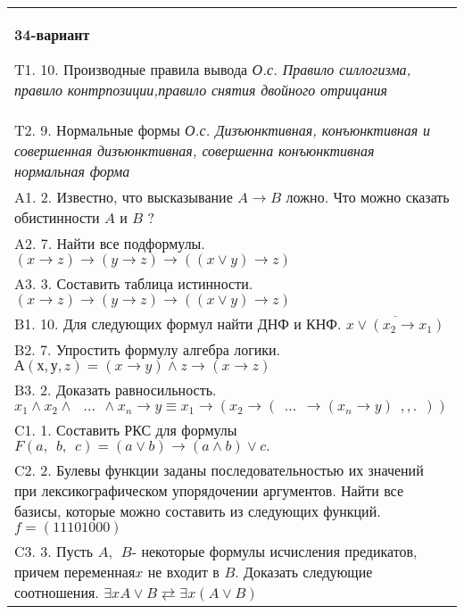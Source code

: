 \documentclass{article}
\begin{document}
\begin{tabular}{m{17cm}}
\textbf{34-вариант}
\newline

T1. 10. Производные правила вывода \emph{О.с. Правило силлогизма, правило контрпозиции,правило снятия двойного отрицания} \\
T2. 9. Нормальные формы \emph{О.с. Дизъюнктивная, конъюнктивная и совершенная дизъюнктивная, совершенна конъюнктивная нормальная форма} \\
A1. 2. Известно, что высказывание \(A \rightarrow B\) ложно. Что можно сказать обистинности \(A\) и \(B\) ? \\
A2. 7. Найти все подформулы. \((x \rightarrow z) \rightarrow (y \rightarrow z) \rightarrow ((x \vee y) \rightarrow z)\) \\
A3. 3. Составить таблица истинности. \((x \rightarrow z) \rightarrow (y \rightarrow z) \rightarrow ((x \vee y) \rightarrow z)\) \\
B1. 10. Для следующих формул найти ДНФ и КНФ. \(\overline{x \vee (x_{2} \rightarrow x_{1})}\) \\
B2. 7. Упростить формулу алгебра логики. \(А(х,у,z) = (x \rightarrow y) \land z \rightarrow (x \rightarrow z)\) \\
B3. 2. Доказать равносильность.\(x_{1} \land x_{2} \land \ \ \ ...\ \  \land x_{n} \rightarrow y \equiv x_{1} \rightarrow (x_{2} \rightarrow (\ \ ...\ \  \rightarrow (x_{n} \rightarrow y)\ \ ,,.\ \ ))\) \\
C1. 1. Составить РКС для формулы \(F(a,\ \ b,\ \ c) = (a \vee b) \rightarrow (a \land b) \vee c.\) \\
C2. 2. Булевы функции заданы последовательностью их значений при лексикографическом упорядочении аргументов. Найти все базисы, которые можно составить из следующих функций. \(f = (11101000)\) \\
C3. 3. Пусть \(A,\ \ B\)- некоторые формулы исчисления предикатов, причем переменная\(x\) не входит в \(B\). Доказать следующие соотношения. \(\exists xA \vee B \rightleftarrows \exists x(A \vee B)\) \\

\end{tabular}
\vspace{1cm}
\end{document}
